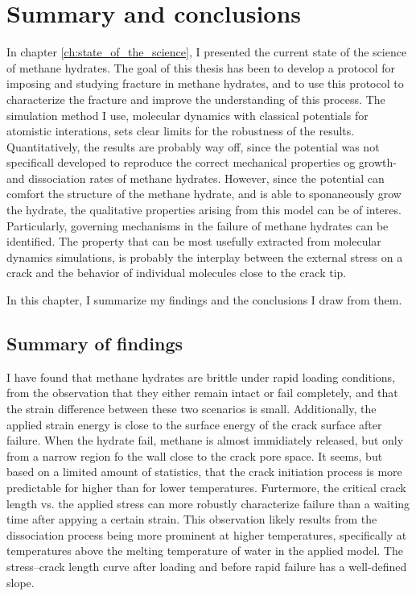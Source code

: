 \chapter{Summary and conclusions}
\label{ch:summary_conclusions}
In chapter \ref{ch:state_of_the_science}, I presented the current state of the science of methane hydrates. The goal of this thesis has been to develop a protocol for imposing and studying fracture in methane hydrates, and to use this protocol to characterize the fracture and improve the understanding of this process. The simulation method I use, molecular dynamics with classical potentials for atomistic interations, sets clear limits for the robustness of the results. Quantitatively, the results are probably way off, since the potential was not specificall developed to reproduce the correct mechanical properties og growth- and dissociation rates of methane hydrates. However, since the potential can comfort the structure of the methane hydrate, and is able to sponaneously grow the hydrate, the qualitative properties arising from this model can be of interes. Particularly, governing mechanisms in the failure of methane hydrates can be identified. The property that can be most usefully extracted from molecular dynamics simulations, is probably the interplay between the external stress on a crack and the behavior of individual molecules close to the crack tip. 

In this chapter, I summarize my findings and the conclusions I draw from them.

\section{Summary of findings}
I have found that methane hydrates are brittle under rapid loading conditions, from the observation that they either remain intact or fail completely, and that the strain difference between these two scenarios is small. Additionally, the applied strain energy is close to the surface energy of the crack surface after failure. When the hydrate fail, methane is almost immidiately released, but only from a narrow region fo the wall close to the crack pore space. It seems, but based on a limited amount of statistics, that the crack initiation process is more predictable for higher than for lower temperatures. Furtermore, the critical crack length vs. the applied stress can more robustly characterize failure than a waiting time after appying a certain strain. This observation likely results from the dissociation process being more prominent at higher temperatures, specifically at temperatures above the melting temperature of water in the applied model. The stress--crack length curve after loading and before rapid failure has a well-defined slope. 

